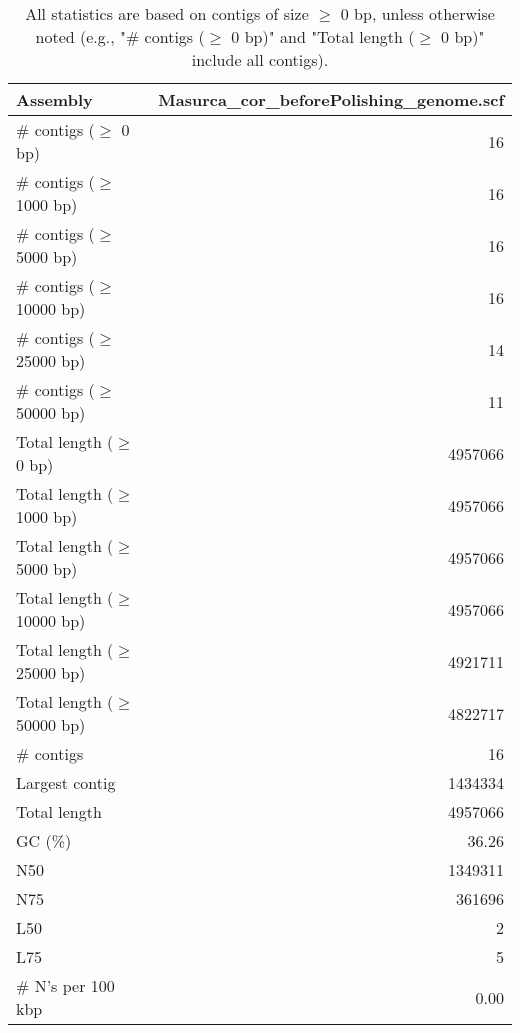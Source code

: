 \documentclass[12pt,a4paper]{article}
\begin{document}
\begin{table}[ht]
\begin{center}
\caption{All statistics are based on contigs of size $\geq$ 0 bp, unless otherwise noted (e.g., "\# contigs ($\geq$ 0 bp)" and "Total length ($\geq$ 0 bp)" include all contigs).}
\begin{tabular}{|l*{1}{|r}|}
\hline
Assembly & Masurca\_cor\_beforePolishing\_genome.scf \\ \hline
\# contigs ($\geq$ 0 bp) & 16 \\ \hline
\# contigs ($\geq$ 1000 bp) & 16 \\ \hline
\# contigs ($\geq$ 5000 bp) & 16 \\ \hline
\# contigs ($\geq$ 10000 bp) & 16 \\ \hline
\# contigs ($\geq$ 25000 bp) & 14 \\ \hline
\# contigs ($\geq$ 50000 bp) & 11 \\ \hline
Total length ($\geq$ 0 bp) & 4957066 \\ \hline
Total length ($\geq$ 1000 bp) & 4957066 \\ \hline
Total length ($\geq$ 5000 bp) & 4957066 \\ \hline
Total length ($\geq$ 10000 bp) & 4957066 \\ \hline
Total length ($\geq$ 25000 bp) & 4921711 \\ \hline
Total length ($\geq$ 50000 bp) & 4822717 \\ \hline
\# contigs & 16 \\ \hline
Largest contig & 1434334 \\ \hline
Total length & 4957066 \\ \hline
GC (\%) & 36.26 \\ \hline
N50 & 1349311 \\ \hline
N75 & 361696 \\ \hline
L50 & 2 \\ \hline
L75 & 5 \\ \hline
\# N's per 100 kbp & 0.00 \\ \hline
\end{tabular}
\end{center}
\end{table}
\end{document}
